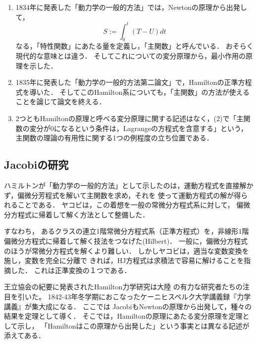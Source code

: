 \documentclass[uplatex,dvipdfmx]{jsreport}
\begin{document}
\begin{history}[力学への応用]\mbox{}
    \begin{enumerate}
        \item 1834年に発表した「動力学の一般的方法」\cite{Hamilton34}では，Newtonの原理から出発して，
        \[S:=\int^t_0(T-U)dt\]
        なる，「特性関数」にあたる量を定義し，「主関数」と呼んでいる．
        おそらく現代的な意味とは違う．
        そしてこれについての変分原理から，最小作用の原理を示した．
        \item 1835年に発表した「動力学の一般的方法第二論文」\cite{Hamilton35}で，Hamiltonの正準方程式を導いた．
        そしてこのHamilton系についても，「主関数」の方法が使えることを論じて論文を終える．
        \item 2つともHamiltonの原理と呼べる変分原理に関する記述はなく，(2)で「主関数の変分が$0$になるという条件は，Lagrangeの方程式を含意する」という，主関数の理論の有用性に関する1つの例程度の立ち位置である．
    \end{enumerate}
\end{history}

\subsection{Jacobiの研究}

\begin{tcolorbox}[colframe=ForestGreen, colback=ForestGreen!10!white,breakable,colbacktitle=ForestGreen!40!white,coltitle=black,fonttitle=\bfseries\sffamily,
title=]
    ハミルトンが「動力学の一般的方法」として示したのは，運動方程式を直接解かず，偏微分芳程式を解いて主関数を求め，それを
    使って運動方程式の解が得られることである．
    ヤコビは，この着想を一般の常微分方程式系に対して，
    偏微分方程式に帰着して解く方法として整備した．
    
    すなわち，
    あるクラスの連立1階常微分方程式系（正準方程式）を，非線形1階偏微分方程式に帰着して解く技法をつなげた(Hilbert\cite{Hilbert37})．
    一般に，偏微分方程式のほうが常微分方程式を解くより難しい．
    しかしヤコビは，適当な変数変換を施し，変数を完全に分離で
    きれば，HJ方程式は求積法で容易に解けることを指摘した．
    これは正準変換の１つである．
\end{tcolorbox}

\begin{history}
    王立協会の紀要に発表されたHamilton力学研究は大陸
    の有力な研究者たちの注目を引いた。
    1842-43年冬学期におこなったケーニヒスベルク大学講義録『力学講義』が集大成になる．
    ここでは
    JacobiもNewtonの原理から出発して，種々の結果を定理として導く．
    そこでは，Hamiltonの原理にあたる変分原理を定理として示し，
    「Hamiltonはこの原理から出発した」という事実とは異なる記述が添えてある．
\end{history}
\end{document}
